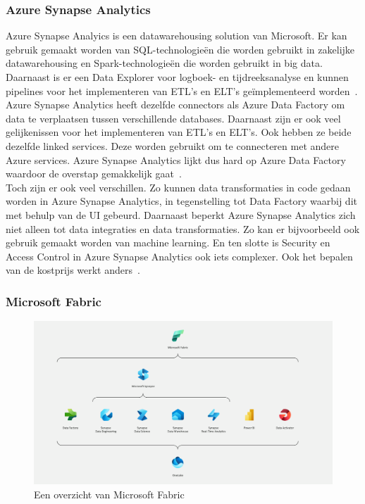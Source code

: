 \subsubsection{Azure Synapse Analytics}

Azure Synapse Analyics is een datawarehousing solution van Microsoft. Er kan gebruik gemaakt worden van SQL-technologieën die worden gebruikt in zakelijke datawarehousing en Spark-technologieën die worden gebruikt in big data. Daarnaast is er een Data Explorer voor logboek- en tijdreeksanalyse en kunnen pipelines voor het implementeren van ETL's en ELT's geïmplementeerd worden~\autocite{Microsoft2024j}.\\

Azure Synapse Analytics heeft dezelfde connectors als Azure Data Factory om data te verplaatsen tussen verschillende databases. Daarnaast zijn er ook veel gelijkenissen voor het implementeren van ETL's en ELT's. Ook hebben ze beide dezelfde linked services. Deze worden gebruikt om te connecteren met andere Azure services. Azure Synapse Analytics lijkt dus hard op Azure Data Factory waardoor de overstap gemakkelijk gaat~\autocite{Gaikwad2023}.\\

Toch zijn er ook veel verschillen. Zo kunnen data transformaties in code gedaan worden in Azure Synapse Analytics, in tegenstelling tot Data Factory waarbij dit met behulp van de UI gebeurd. Daarnaast beperkt Azure Synapse Analytics zich niet alleen tot data integraties en data transformaties. Zo kan er bijvoorbeeld ook gebruik gemaakt worden van machine learning. En ten slotte is Security en Access Control in Azure Synapse Analytics ook iets complexer. Ook het bepalen van de kostprijs werkt anders~\autocite{Gaikwad2023}.

\subsubsection{Microsoft Fabric}

\begin{figure}[H]
    \centering
    \includegraphics[width=1\textwidth]{./graphics/standvanzaken/fabric.png}
    \caption{Een overzicht van Microsoft Fabric~\autocite{Pykes2023}}
\end{figure}

